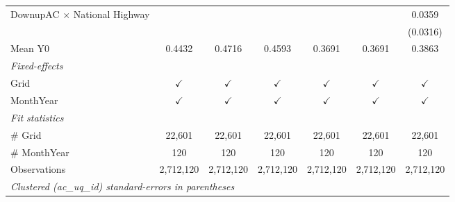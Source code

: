 \begin{table}[htbp]
\begin{tabular}{lcccccc}
      DownupAC $\times$ National Highway                         &               &               &               &               &               & 0.0359\\   
                                                                 &               &               &               &               &               & (0.0316)\\   
      \hline Mean Y0                                             & 0.4432        & 0.4716        & 0.4593        & 0.3691        & 0.3691        & 0.3863\\  
      \midrule
      \emph{Fixed-effects}\\
      Grid                                                       & $\checkmark$  & $\checkmark$  & $\checkmark$  & $\checkmark$  & $\checkmark$  & $\checkmark$\\   
      MonthYear                                                  & $\checkmark$  & $\checkmark$  & $\checkmark$  & $\checkmark$  & $\checkmark$  & $\checkmark$\\   
      \midrule
      \emph{Fit statistics}\\
      \# Grid                                                    & 22,601        & 22,601        & 22,601        & 22,601        & 22,601        & 22,601\\  
      \# MonthYear                                               & 120           & 120           & 120           & 120           & 120           & 120\\  
      Observations                                               & 2,712,120     & 2,712,120     & 2,712,120     & 2,712,120     & 2,712,120     & 2,712,120\\  
      \midrule \midrule
      \multicolumn{7}{l}{\emph{Clustered (ac\_uq\_id) standard-errors in parentheses}}\\
   \end{tabular}
\end{table}



